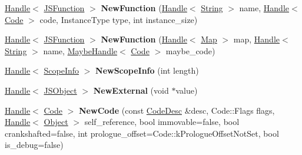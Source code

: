 \begin{DoxyCompactItemize}
\item 
\hyperlink{classv8_1_1internal_1_1_handle}{Handle}$<$ \hyperlink{classv8_1_1internal_1_1_j_s_function}{J\+S\+Function} $>$ {\bfseries New\+Function} (\hyperlink{classv8_1_1internal_1_1_handle}{Handle}$<$ \hyperlink{classv8_1_1internal_1_1_string}{String} $>$ name, \hyperlink{classv8_1_1internal_1_1_handle}{Handle}$<$ \hyperlink{classv8_1_1internal_1_1_code}{Code} $>$ code, Instance\+Type type, int instance\+\_\+size)\hypertarget{classv8_1_1internal_1_1_factory_a284c3b039870ac79e7ecc97da875c6ee}{}\label{classv8_1_1internal_1_1_factory_a284c3b039870ac79e7ecc97da875c6ee}

\item 
\hyperlink{classv8_1_1internal_1_1_handle}{Handle}$<$ \hyperlink{classv8_1_1internal_1_1_j_s_function}{J\+S\+Function} $>$ {\bfseries New\+Function} (\hyperlink{classv8_1_1internal_1_1_handle}{Handle}$<$ \hyperlink{classv8_1_1internal_1_1_map}{Map} $>$ map, \hyperlink{classv8_1_1internal_1_1_handle}{Handle}$<$ \hyperlink{classv8_1_1internal_1_1_string}{String} $>$ name, \hyperlink{classv8_1_1internal_1_1_maybe_handle}{Maybe\+Handle}$<$ \hyperlink{classv8_1_1internal_1_1_code}{Code} $>$ maybe\+\_\+code)\hypertarget{classv8_1_1internal_1_1_factory_ab7995e6b3fc485dfc2e326a31de14889}{}\label{classv8_1_1internal_1_1_factory_ab7995e6b3fc485dfc2e326a31de14889}

\item 
\hyperlink{classv8_1_1internal_1_1_handle}{Handle}$<$ \hyperlink{classv8_1_1internal_1_1_scope_info}{Scope\+Info} $>$ {\bfseries New\+Scope\+Info} (int length)\hypertarget{classv8_1_1internal_1_1_factory_a500ab2754979b0da0d071937f7cdef25}{}\label{classv8_1_1internal_1_1_factory_a500ab2754979b0da0d071937f7cdef25}

\item 
\hyperlink{classv8_1_1internal_1_1_handle}{Handle}$<$ \hyperlink{classv8_1_1internal_1_1_j_s_object}{J\+S\+Object} $>$ {\bfseries New\+External} (void $\ast$value)\hypertarget{classv8_1_1internal_1_1_factory_a7900b14bc9c192850727e6b7af779e27}{}\label{classv8_1_1internal_1_1_factory_a7900b14bc9c192850727e6b7af779e27}

\item 
\hyperlink{classv8_1_1internal_1_1_handle}{Handle}$<$ \hyperlink{classv8_1_1internal_1_1_code}{Code} $>$ {\bfseries New\+Code} (const \hyperlink{structv8_1_1internal_1_1_code_desc}{Code\+Desc} \&desc, Code\+::\+Flags flags, \hyperlink{classv8_1_1internal_1_1_handle}{Handle}$<$ \hyperlink{classv8_1_1internal_1_1_object}{Object} $>$ self\+\_\+reference, bool immovable=false, bool crankshafted=false, int prologue\+\_\+offset=Code\+::k\+Prologue\+Offset\+Not\+Set, bool is\+\_\+debug=false)\hypertarget{classv8_1_1internal_1_1_factory_ac82b694994cfa0b28f5741fb2f6c4657}{}\label{classv8_1_1internal_1_1_factory_ac82b694994cfa0b28f5741fb2f6c4657}


\end{DoxyCompactItemize}
